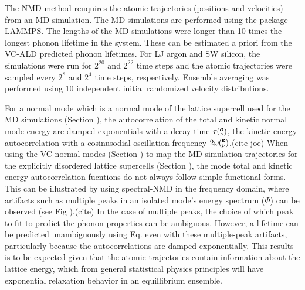 \documentclass[aps,prb,onecolumn,preprint,superscriptaddress,amsmath,amssymb,floatfix]{revtex4}
\newcommand{\kv}{\mspace{-4.0mu}\left(\mspace{-8.0mu}
\begin{smallmatrix}&\pmb{\kappa} \\&\nu\end{smallmatrix}
\mspace{-3.0mu}\right)}
\begin{document}
The NMD method reuquires the atomic trajectories (positions and velocities) 
from an MD simulation. 
The MD simulations are performed using the package LAMMPS.
\cite{plimpton_fast_1995} The lengths of the MD simulations were longer 
than 10 times the longest phonon lifetime in the system. These can 
be estimated a priori from the VC-ALD predicted phonon lifetimes. For LJ 
argon and SW silicon, the simulations were run for $2^20$ and 
$2^22$ time steps and the atomic trajectories were sampled 
every $2^8$ and $2^4$ time steps, respectively. 
Ensemble averaging was performed using 10 independent initial 
randomized velocity distributions. 

For a normal mode which is a normal mode of the lattice supercell 
used for the MD simulations (Section ), 
the autocorrelation of the total and kinetic     
normal mode energy are damped exponentials 
with a decay time $\tau\kv$, the kinetic energy autocorrelation with a 
cosinusodial oscillation frequency 
$2\omega\kv$.(cite joe) 
When using the VC normal modes (Section ) to map the MD simulation 
trajectories for the explicitly disordered lattice supercells (Section ), 
the mode total and kinetic energy autocorrelation fucntions 
do not always follow simple functional forms. 
This can be illustrated by using spectral-NMD 
in the frequency domain, where artifacts such as 
multiple peaks in an isolated mode's 
energy spectrum ($\Phi$) can be observed (see Fig ).(cite)  
In the case 
of multiple peaks, the choice of which peak to fit to predict the phonon 
properties can be ambiguous.  However, 
a lifetime can be predicted unambiguously using Eq. even with 
these multiple-peak artifacts, particularly because the autocorrelations 
are damped exponentially. This results is to be expected 
given that the atomic trajectories contain 
information about the lattice energy, which from general statistical 
physics principles will have exponential relaxation behavior in an 
equillibrium ensemble.
\cite{srivastava_physics_1990,landau_statistical_1980,
rajabpour_thermal_2010}
\end{document}
